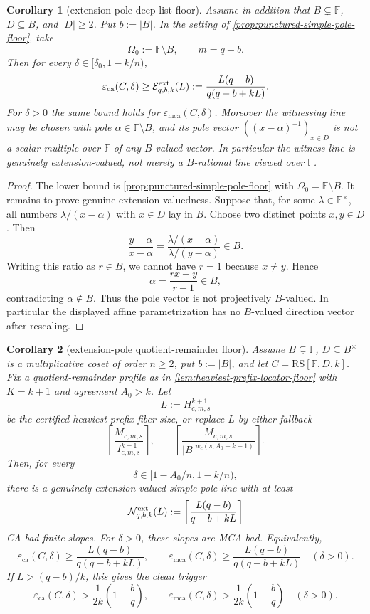 \documentclass[11pt]{article}
\newtheorem{corollary}[corollary]{Corollary}
\theoremstyle{definition}
\theoremstyle{remark}
\newcommand{\F}{\mathbb{F}}
\newcommand{\B}{B}
\newcommand{\RS}{\mathrm{RS}}
\newcommand{\eca}{\varepsilon_{\mathrm{ca}}}
\newcommand{\emca}{\varepsilon_{\mathrm{mca}}}
\begin{document}
\begin{corollary}[extension-pole deep-list floor]
\label{cor:extension-pole-deep-list-floor}
Assume in addition that $\B\subsetneq\F$, $D\subseteq\B$, and $|D|\ge2$.  Put
$b:=|\B|$.  In the setting of
\cref{prop:punctured-simple-pole-floor}, take
\[
        \Omega_0:=\F\setminus\B,
        \qquad m=q-b .
\]
Then for every $\delta\in[\delta_0,1-k/n)$,
\[
        \eca(C,\delta)
        \ge
        \mathcal E^{\rm ext}_{q,b,k}(L)
        :=
        \frac{L(q-b)}{q(q-b+kL)} .
\]
For $\delta>0$ the same bound holds for $\emca(C,\delta)$.  Moreover the
witnessing line may be chosen with pole $\alpha\in\F\setminus\B$, and its pole
vector $((x-\alpha)^{-1})_{x\in D}$ is not a scalar multiple over $\F$ of any
$\B$-valued vector.  In particular the witness line is genuinely
extension-valued, not merely a $\B$-rational line viewed over $\F$.
\end{corollary}

\begin{proof}
The lower bound is \cref{prop:punctured-simple-pole-floor} with
$\Omega_0=\F\setminus\B$.  It remains to prove genuine extension-valuedness.
Suppose that, for some $\lambda\in\F^\times$, all numbers
$\lambda/(x-\alpha)$ with $x\in D$ lay in $\B$.  Choose two distinct points
$x,y\in D$.  Then
\[
        \frac{y-\alpha}{x-\alpha}
        =
        \frac{\lambda/(x-\alpha)}{\lambda/(y-\alpha)}
        \in \B .
\]
Writing this ratio as $r\in\B$, we cannot have $r=1$ because $x\ne y$.  Hence
\[
        \alpha=\frac{rx-y}{r-1}\in\B,
\]
contradicting $\alpha\notin\B$.  Thus the pole vector is not projectively
$\B$-valued.  In particular the displayed affine parametrization has no
$\B$-valued direction vector after rescaling.
\end{proof}

\begin{corollary}[extension-pole quotient-remainder floor]
\label{cor:extension-pole-quotient-remainder-floor}
Assume $\B\subsetneq\F$, $D\subseteq\B^\times$ is a multiplicative coset of order
$n\ge2$, put $b:=|\B|$, and let $C=\RS[\F,D,k]$.
Fix a quotient-remainder profile as in
\cref{lem:heaviest-prefix-locator-floor} with $K=k+1$ and agreement $A_0>k$.
Let
\[
        L:=H_{c,m,s}^{k+1}
\]
be the certified heaviest prefix-fiber size, or replace $L$ by either fallback
\[
        \left\lceil \frac{M_{c,m,s}}{I_{c,m,s}^{k+1}}\right\rceil,
        \qquad
        \left\lceil\frac{M_{c,m,s}}{|\B|^{w_c(s,A_0-k-1)}}\right\rceil .
\]
Then, for every
\[
        \delta\in[1-A_0/n,1-k/n),
\]
there is a genuinely extension-valued simple-pole line with at least
\[
        \mathcal N^{\rm ext}_{q,b,k}(L)
        :=
        \left\lceil\frac{L(q-b)}{q-b+kL}\right\rceil
\]
CA-bad finite slopes.  For $\delta>0$, these slopes are MCA-bad.  Equivalently,
\[
        \eca(C,\delta)
        \ge
        \frac{L(q-b)}{q(q-b+kL)},
        \qquad
        \emca(C,\delta)
        \ge
        \frac{L(q-b)}{q(q-b+kL)}
        \quad(\delta>0).
\]
If $L>(q-b)/k$, this gives the clean trigger
\[
        \eca(C,\delta)>
        \frac1{2k}\left(1-\frac bq\right),
        \qquad
        \emca(C,\delta)>
        \frac1{2k}\left(1-\frac bq\right)
        \quad(\delta>0).
\]
\end{corollary}
\end{document}
